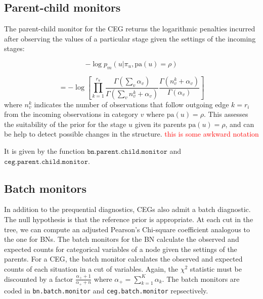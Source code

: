 \documentclass[12pt]{article}
\begin{document}
\subsection{Parent-child monitors}

The parent-child monitor for the CEG returns the logarithmic penalties incurred after observing the values of a particular stage given the settings of the incoming stages:

\[
-\log p_m( u | \pi_u, \text{pa}(u) = \rho)
\]
 
 \[
=-\log \left[ \prod_{k=1} ^ {r_u} \frac{\Gamma (\sum_v \alpha_v)}{\Gamma(\sum_v n_v^k + \alpha_v)}  \frac{\Gamma(n_v^k + \alpha_v)}{\Gamma(\alpha_v)} \right]
 \]
  where $n_v^k$ indicates the number of observations that follow outgoing edge $k=r_i$ from the incoming observations in category $v$ where $\text{pa}(u) = \rho$. This assesses the suitability of the prior for the stage $u$ given its parents  $\text{pa}(u) = \rho$, and can be help to detect possible changes in the structure. \textcolor{red}{this is some awkward notation}
  
  It is given by the function $\texttt{bn.parent.child.monitor}$ and $\texttt{ceg.parent.child.monitor}$. 

%
%
\subsection{Batch monitors}
In addition to the prequential diagnostics, CEGs also admit a batch diagnostic. The null hypothesis is that the reference prior is appropriate. At each cut in the tree, we can compute an adjusted Pearson's Chi-square coefficient analogous to the one for BNs.  The batch monitors for the BN calculate the observed and expected counts for categorical variables of a node given the settings of the parents. For a CEG, the batch monitor calculates the observed and expected counts of each situation in a cut of variables.
Again, the $\chi^2$ statistic must be discounted by a factor $\frac{\alpha_+ + 1}{\alpha_+ + n }$ where $\alpha_+ = \sum_{k=1}^K \alpha_k$. The batch monitors are coded in \texttt{bn.batch.monitor} and \texttt{ceg.batch.monitor} repsectively.
\end{document}
